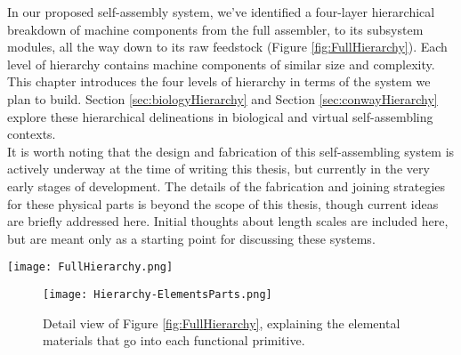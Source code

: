 {In our proposed self-assembly system, we've identified a four-layer hierarchical breakdown of machine components from the full assembler, to its subsystem modules, all the way down to its raw feedstock (Figure \ref{fig:FullHierarchy}).  Each level of hierarchy contains machine components of similar size and complexity.  This chapter introduces the four levels of hierarchy in terms of the system we plan to build.  Section \ref{sec:biologyHierarchy} and Section \ref{sec:conwayHierarchy} explore these hierarchical delineations in biological and virtual self-assembling contexts.\\ 

It is worth noting that the design and fabrication of this self-assembling system is actively underway at the time of writing this thesis, but currently in the very early stages of development.  The details of the fabrication and joining strategies for these physical parts is beyond the scope of this thesis, though current ideas are briefly addressed here.  Initial thoughts about length scales are included here, but are meant only as a starting point for discussing these systems.


\begin{sidewaysfigure}
 \texttt{[image: FullHierarchy.png]}
  \caption{Diagram of the hierarchical breakdown of robotic modules into functions and elements.  Examples of the geometric layout of elements to form functional primitives are indicated for a 1DOF bending flexure and a capacitor.  Images of fabricated functional parts are shown alongside their functional primitive decompositions.  More detailed views of the transition from elements to functional primitives and from functional primitives to functional parts are shown in Figures \ref{fig:Hierarchy-ElementsParts} and \ref{fig:Hierarchy-FunctionPrimitivesParts}.  \textit{Image Credit (for photos of fabricated functional parts): Will Langford 2016} }
  \label{fig:FullHierarchy}
\end{sidewaysfigure}

\begin{figure}
  \texttt{[image: Hierarchy-ElementsParts.png]}
  \caption{Detail view of Figure \ref{fig:FullHierarchy}, explaining the elemental materials that go into each functional primitive.}
  \label{fig:Hierarchy-ElementsParts}
\end{figure}

}
